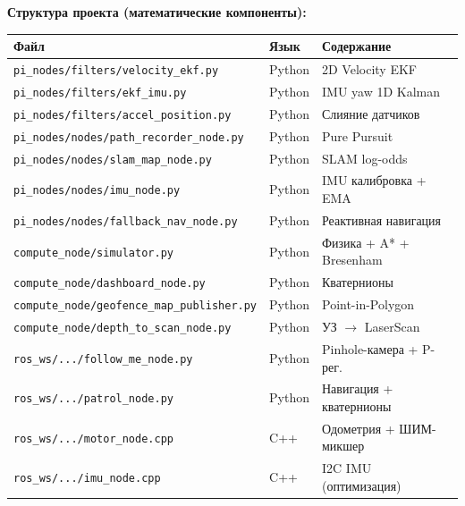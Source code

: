 \documentclass[12pt, a4paper, openany]{book}
\numberwithin{equation}{chapter}
\begin{document}
\textbf{Структура проекта (математические компоненты):}
\begin{center}
\begin{tabular}{lll}
\toprule
\textbf{Файл} & \textbf{Язык} & \textbf{Содержание}\\
\midrule
\texttt{pi\_nodes/filters/velocity\_ekf.py} & Python & 2D Velocity EKF\\
\texttt{pi\_nodes/filters/ekf\_imu.py} & Python & IMU yaw 1D Kalman\\
\texttt{pi\_nodes/filters/accel\_position.py} & Python & Слияние датчиков\\
\texttt{pi\_nodes/nodes/path\_recorder\_node.py} & Python & Pure Pursuit\\
\texttt{pi\_nodes/nodes/slam\_map\_node.py} & Python & SLAM log-odds\\
\texttt{pi\_nodes/nodes/imu\_node.py} & Python & IMU калибровка + EMA\\
\texttt{pi\_nodes/nodes/fallback\_nav\_node.py} & Python & Реактивная навигация\\
\texttt{compute\_node/simulator.py} & Python & Физика + A* + Bresenham\\
\texttt{compute\_node/dashboard\_node.py} & Python & Кватернионы\\
\texttt{compute\_node/geofence\_map\_publisher.py} & Python & Point-in-Polygon\\
\texttt{compute\_node/depth\_to\_scan\_node.py} & Python & УЗ $\to$ LaserScan\\
\texttt{ros\_ws/.../follow\_me\_node.py} & Python & Pinhole-камера + P-рег.\\
\texttt{ros\_ws/.../patrol\_node.py} & Python & Навигация + кватернионы\\
\texttt{ros\_ws/.../motor\_node.cpp} & C++ & Одометрия + ШИМ-микшер\\
\texttt{ros\_ws/.../imu\_node.cpp} & C++ & I2C IMU (оптимизация)\\
\bottomrule
\end{tabular}
\end{center}
















\end{document}
